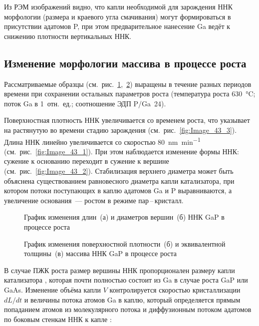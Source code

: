 Из РЭМ изображений видно, что капли необходимой для зарождения ННК морфологии
(размера и краевого угла смачивания) могут формироваться в присутствии адатомов
P, при этом предварительное нанесение Ga ведёт к снижению плотности
вертикальных ННК.

\subsection{Изменение морфологии массива в процессе
роста}\label{subsec:ch6/sec2/sub2}

Рассматриваемые образцы
(см.~рис.~\cref{fig:Image_43_12},~\cref{fig:Image_43_34}) выращены в течение
разных периодов времени при сохранении остальных параметров роста (температура
роста 630~\si{\degreeCelsius}; поток Ga в 1~отн.~ед.; соотношение ЭДП P/Ga~24).

Поверхностная плотность ННК увеличивается со временем роста, что указывает на растянутую во времени стадию
зарождения (см.~рис.~\cref{fig:Image_43_3}).
Длина ННК линейно увеличивается со скоростью
80~\si{\nano\meter\per\minute} (см.~рис.~\cref{fig:Image_43_1}). При этом
наблюдается изменение формы ННК: сужение к основанию переходит в сужение к
вершине (см.~рис.~\cref{fig:Image_43_2}). Стабилизация верхнего диаметра может
быть объяснена существованием равновесного диаметра капли катализатора, при
котором потоки поступающих в каплю адатомов Ga и P выравниваются, а увеличение
основания~--- ростом в режиме пар\,--\,кристалл.

\begin{figure}[ht]  \caption{}График
	изменения длин~(а) и диаметров вершин~(б) ННК GaP в процессе
роста\label{fig:Image_43_12} \end{figure}

\begin{figure}[ht]  \caption{График
		изменения поверхностной плотности~(б) и эквивалентной толщины~(в) массива ННК
GaP в процессе роста}\label{fig:Image_43_34} \end{figure}

В случае ПЖК роста размер вершины ННК пропорционален размеру капли катализатора
\cite{glas2010vapor}, которая почти полностью состоит из Ga в случае роста GaP
или GaAs. Изменение объёма капли \(V\) контролируется скоростью кристаллизации
\(dL/dt\) и величины потока атомов Ga в каплю, который определяется прямым
попаданием атомов из молекулярного потока и диффузионным потоком адатомов по
боковым стенкам ННК к капле \cite{glas2010vapor}:

